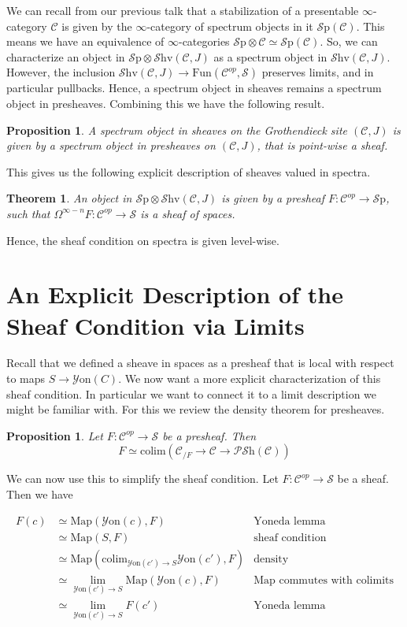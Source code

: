 \documentclass[10pt]{amsart}
\newcommand{\C}{\mathscr{C}}
\newcommand{\s}{\mathscr{S}}
\newcommand{\Map}{\mathrm{Map}}
\newcommand{\Sp}{\mathscr{S}\mathrm{p}}
\newcommand{\Fun}{\mathrm{Fun}}
\newcommand{\colim}{\mathrm{colim}}
\newcommand{\Shv}{\mathscr{S}\mathrm{hv}}
\newcommand{\Yon}{\mathscr{Y}\mathrm{on}}
\newcommand{\PSh}{\mathscr{P}\mathscr{S}\mathrm{h}}
\newtheorem{theorem}[equation]{Theorem}
\newtheorem{proposition}[equation]{Proposition}
\theoremstyle{definition}
\theoremstyle{remark}
\begin{document}
We can recall from our previous talk that a stabilization of a presentable $\infty$-category $\C$ is given by the $\infty$-category of spectrum objects in it $\Sp(\C)$. This means we have an equivalence of $\infty$-categories $\Sp \otimes \C \simeq \Sp(\C)$. So, we can characterize an object in $\Sp \otimes \Shv(\C,J)$ as a spectrum object in $\Shv(\C,J)$. However, the inclusion $\Shv(\C,J) \to \Fun(\C^{op},\s)$ preserves limits, and in particular pullbacks. Hence, a spectrum object in sheaves remains a spectrum object in presheaves. Combining this we have the following result.

\begin{proposition}
  A spectrum object in sheaves on the Grothendieck site $(\C,J)$ is given by a spectrum object in presheaves on $(\C,J)$, that is point-wise a sheaf.
\end{proposition}

This gives us the following explicit description of sheaves valued in spectra.

\begin{theorem}
  An object in $\Sp \otimes \Shv(\C,J)$ is given by a presheaf $F\colon \C^{op} \to \Sp$, such that $\Omega^{\infty - n}F\colon \C^{op} \to \s$ is a sheaf of spaces.
\end{theorem}

Hence, the sheaf condition on spectra is given level-wise.

\section{An Explicit Description of the Sheaf Condition via Limits}
Recall that we defined a sheave in spaces as a presheaf that is local with respect to maps $S \to \Yon(C)$. We now want a more explicit characterization of this sheaf condition. In particular we want to connect it to a limit description we might be familiar with. For this we review the density theorem for presheaves.

\begin{proposition}
  Let $F\colon\C^{op} \to \s$ be a presheaf. Then 
  \[F \simeq \colim (\C_{/F} \to \C \to \PSh(\C)) \] 
\end{proposition}

We can now use this to simplify the sheaf condition. Let $F \colon \C^{op} \to \s$ be a sheaf. Then we have  

\begin{align*}
F(c) &\simeq \Map(\Yon(c),F) & \text{Yoneda lemma} \\
&\simeq \Map(S,F) & \text{sheaf condition} \\
&\simeq \Map(\colim_{\Yon(c') \to S}\Yon(c'),F) & \text{density}\\
&\simeq \lim_{\Yon(c') \to S} \Map(\Yon(c),F) & \text{Map commutes with colimits}\\
&\simeq \lim_{\Yon(c') \to S} F(c') & \text{Yoneda lemma}
\end{align*}
\end{document}
